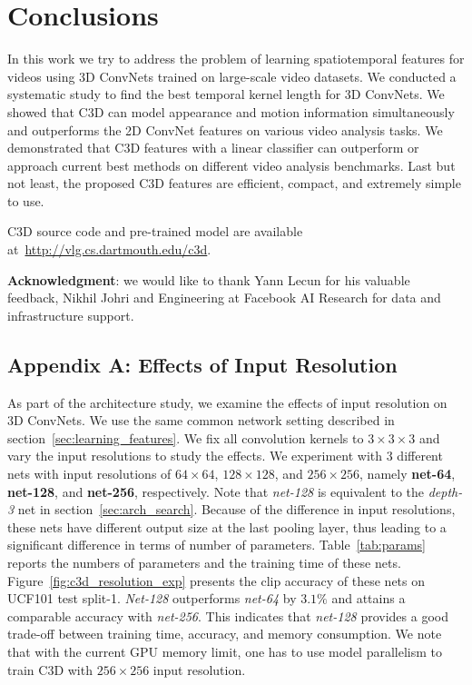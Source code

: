\documentclass[10pt,twocolumn,letterpaper]{article}
\begin{document}
\section{Conclusions}
\label{sec:conclusion}
In this work we try to address the problem of learning spatiotemporal features for videos using 3D ConvNets trained on large-scale video datasets. We conducted a systematic study to find the best temporal kernel length for 3D ConvNets. We showed that C3D can model appearance and motion information simultaneously and outperforms the 2D ConvNet features on various video analysis tasks. We demonstrated that C3D features with a linear classifier can outperform or approach current best methods on different video analysis benchmarks. Last but not least, the proposed C3D features are efficient, compact, and extremely simple to use.

C3D source code and pre-trained model are available at~\url{http://vlg.cs.dartmouth.edu/c3d}.

{\bf Acknowledgment}: we would like to thank Yann Lecun for his valuable feedback, Nikhil Johri and Engineering at Facebook AI Research for data and infrastructure support. 
\subsection*{Appendix A: Effects of Input Resolution}

As part of the architecture study, we examine the effects of input resolution on 3D ConvNets. We use the same common network setting described in section~\ref{sec:learning_features}. We fix all convolution kernels to $3 \times 3 \times 3$ and vary the input resolutions to study the effects. We experiment with $3$ different nets with input resolutions of $64 \times 64$, $128 \times 128$, and $256 \times 256$, namely {\bf net-64}, {\bf net-128}, and {\bf net-256}, respectively. Note that \emph{net-128} is equivalent to the \emph{depth-3} net in section~\ref{sec:arch_search}. Because of the difference in input resolutions, these nets have different output size at the last pooling layer, thus leading to a significant difference in terms of number of parameters. Table~\ref{tab:params} reports the numbers of parameters and the training time of these nets. Figure~\ref{fig:c3d_resolution_exp} presents the clip accuracy of these nets on UCF101 test split-1. \emph{Net-128} outperforms \emph{net-64} by $3.1\%$ and attains a comparable accuracy with \emph{net-256}. This indicates that \emph{net-128} provides a good trade-off between training time, accuracy, and memory consumption. We note that with the current GPU memory limit, one has to use model parallelism to train C3D with $256 \times 256$ input resolution.
\end{document}
